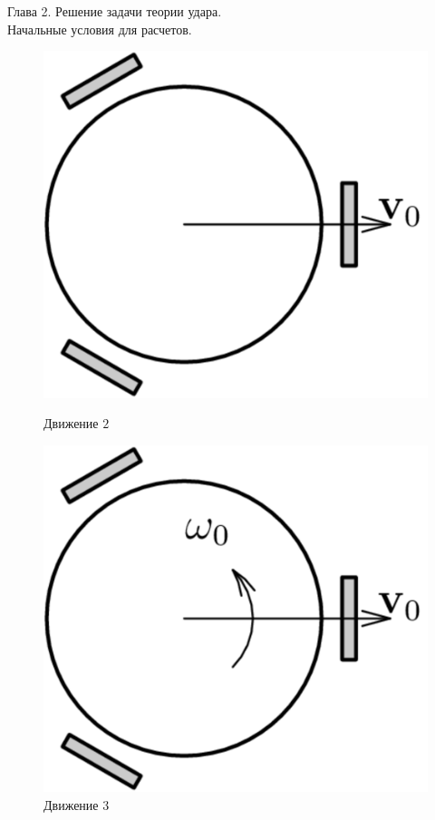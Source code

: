 \begin{myposter}{
    Глава 2. Решение задачи теории удара. \\ Начальные условия для расчетов.
}
{{\begin{figure}[H]
                    \includegraphics[width=\textwidth]{content/pic/asypng/pic_nu_straight.png}
                    \caption{\huge{Движение $2$}}
                \endminipage
                \quad
                    \hspace{60pt}
                    \centering
                    \includegraphics[width=\textwidth]{content/pic/asypng/pic_nu_wrench.png}
                    \caption{\huge{Движение $3$}}
                \endminipage
            \end{figure}
            \vspace{10pt}
        }
    }
    
\end{myposter}
